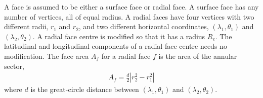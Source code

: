 A face is assumed to be either a surface face or radial face.
A surface face has any number of vertices, all of equal radius.
A radial faces have four vertices with two different radii, $r_1$ and $r_2$, and two different horizontal coordinates, $(\lambda_1, \theta_1)$ and $(\lambda_2, \theta_2)$.
A radial face centre is modified so that it has a radius $R_e$.  The latitudinal and longitudinal components of a radial face centre needs no modification. 
The face area $A_f$ for a radial face $f$ is the area of the annular sector,
\begin{align}
	A_f = \frac{d}{2} \left\lvert r_2^2 - r_1^2 \right\rvert
\end{align}
where $d$ is the great-circle distance between $(\lambda_1, \theta_1)$ and $(\lambda_2, \theta_2)$.

